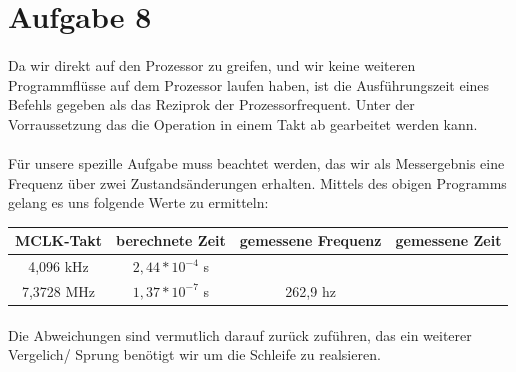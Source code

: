 \section*{Aufgabe 8}

\paragraph*{}
Da wir direkt auf den Prozessor zu greifen, und wir keine weiteren Programmflüsse auf dem Prozessor laufen haben, ist die Ausführungszeit eines Befehls gegeben als das Reziprok der Prozessorfrequent. Unter der Vorraussetzung das die Operation in einem Takt ab gearbeitet werden kann. 



\paragraph*{}
Für unsere spezille Aufgabe muss beachtet werden, das wir als Messergebnis eine Frequenz über zwei Zustandsänderungen erhalten.
Mittels des obigen Programms gelang es uns folgende Werte zu ermitteln: \\

\begin{tabular}{ c | c | c | c}\hline \hline
MCLK-Takt & berechnete Zeit & gemessene Frequenz & gemessene Zeit \\ \hline
4,096 kHz & $ 2,44 * 10^{-4} $ s &  & \\ \hline
7,3728 MHz & $ 1,37 * 10^{-7} $ s  & 262,9 hz & \\ \hline
\end{tabular}

\paragraph*{}
Die Abweichungen sind vermutlich darauf zurück zuführen, das ein weiterer Vergelich/ Sprung benötigt wir um die Schleife zu realsieren.

